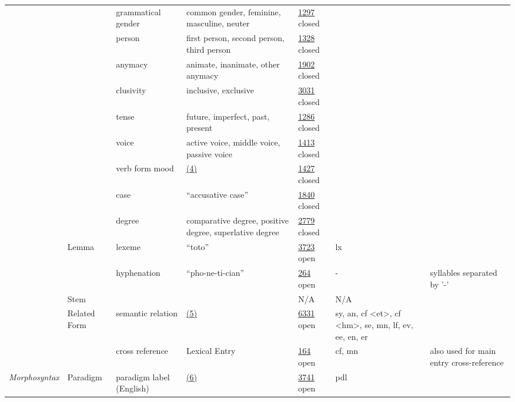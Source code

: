 \documentclass[a4paper,12pt]{article}
\begin{document}
\begin{center}
\begin{longtable}{*7{p{2cm}}}
& & grammatical gender & common gender, feminine, masculine, neuter & \href{http://www.isocat.org/datcat/DC-1297}{1297} closed & & \\ \cmidrule{3-7}
& & person & first person, second person, third person & \href{http://www.isocat.org/datcat/DC-1328}{1328} closed & & \\ \cmidrule{3-7}
& & anymacy & animate, inanimate, other anymacy & \href{http://www.isocat.org/datcat/DC-1902}{1902} closed & & \\ \cmidrule{3-7}
& & clusivity & inclusive, exclusive & \href{http://www.isocat.org/datcat/DC-3031}{3031} closed & & \\ \cmidrule{3-7}
& & tense & future, imperfect, past, present & \href{http://www.isocat.org/datcat/DC-1286}{1286} closed & & \\ \cmidrule{3-7}
& & voice & active voice, middle voice, passive voice & \href{http://www.isocat.org/datcat/DC-1413}{1413} closed & & \\ \cmidrule{3-7}
& & verb form mood & \hyperlink{4}{(4)} \hypertarget{mood}{} & \href{http://www.isocat.org/datcat/DC-1427}{1427} closed & & \\ \cmidrule{3-7}
& & case & ``accusative case'' & \href{http://www.isocat.org/datcat/DC-1840}{1840} closed & & \\ \cmidrule{3-7}
& & degree & comparative degree, positive degree, superlative degree & \href{http://www.isocat.org/datcat/DC-2779}{2779} closed & & \\ \cmidrule{2-7}
& \multirow{2}{2cm}{Lemma} & lexeme & ``toto'' & \href{http://www.isocat.org/datcat/DC-3723}{3723} open & lx & \\ \cmidrule{3-7}
& & hyphenation & ``pho-ne-ti-cian'' & \href{http://www.isocat.org/datcat/DC-264}{264} open & - & syllables separated by '-' \\ \cmidrule{2-7}
& \multirow{1}{2cm}{Stem} & & & N/A & N/A & \\ \cmidrule{2-7}
& \multirow{2}{2cm}{Related Form} & semantic relation & \hyperlink{5}{(5)} \hypertarget{relation}{} & \href{http://www.isocat.org/datcat/DC-6331}{6331} open & sy, an, cf \textless et\textgreater, cf \textless hm\textgreater, se, mn, lf, ev, ee, en, er & \\ \cmidrule{3-7}
& & cross reference & Lexical Entry & \href{http://www.isocat.org/datcat/DC-164}{164} open & cf, mn & also used for main entry cross-reference \\ \cmidrule{1-7}
\multirow{5}{2cm}{\textit{Mor\-pho\-syn\-tax}} & \multirow{5}{2cm}{Paradigm} & paradigm label (English) & \hyperlink{6}{(6)} \hypertarget{paradigm}{} & \href{http://www.isocat.org/datcat/DC-3741}{3741} open & pdl & \\ \cmidrule{3-7}

\end{longtable}
\end{center}
\end{document}
